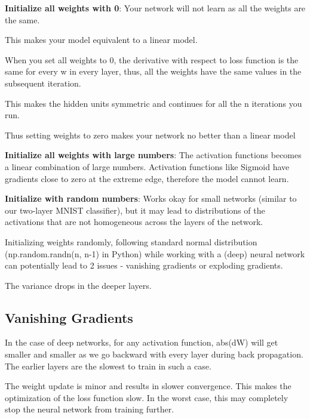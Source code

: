 	\begin{bulletedlist}
		\item {\bfseries Initialize all weights with 0}:  Your network will not learn as all the weights are the same.
		\begin{bulletedlist}
			\item This makes your model equivalent to a linear model.
			\item When you set all weights to 0, the derivative with respect to loss function is the same for every w in every layer, thus, all the weights have the same values in the subsequent iteration.
			\item This makes the hidden units symmetric and continues for all the n iterations you run.
			\item Thus setting weights to zero makes your network no better than a linear model
		\end{bulletedlist}
		\item {\bfseries Initialize all weights with large numbers}:  The activation functions becomes a linear combination of large numbers.  Activation functions like Sigmoid have gradients close to zero at the extreme edge, therefore the model cannot learn.
		\item {\bfseries Initialize with random numbers}: Works okay for small networks (similar to our two-layer MNIST classifier), but it may lead to distributions of the activations that are not homogeneous across the layers of the network.
		\begin{bulletedlist}
			\item Initializing weights randomly, following standard normal distribution (np.random.randn(n, n-1) in Python) while working with a (deep) neural network can potentially lead to 2 issues - vanishing gradients or exploding gradients.
			\item The variance drops in the deeper layers.
		\end{bulletedlist}
	\end{bulletedlist}

	\subsection{Vanishing Gradients}
In the case of deep networks, for any activation function, abs(dW) will get smaller and smaller as we go backward with every layer during back propagation.  The earlier layers are the
slowest to train in such a case.

The weight update is minor and results in slower convergence.  This makes the optimization of the loss function slow.  In the worst case, this may completely stop the neural network from training further.

